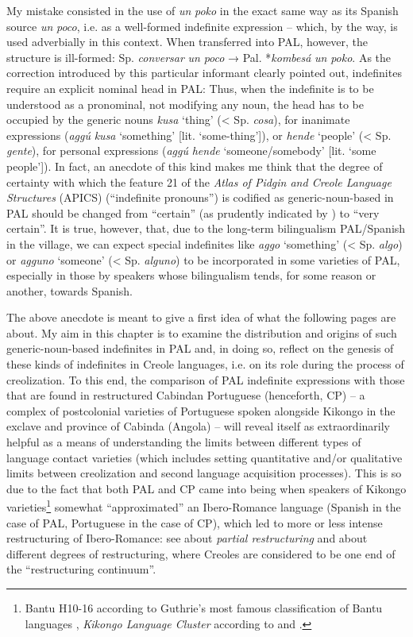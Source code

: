 \documentclass[output=paper,colorlinks,citecolor=brown]{langscibook}
\begin{document}
My mistake consisted in the use of \textit{un} \textit{poko} in the exact same way as its Spanish source \textit{un} \textit{poco}, i.e. as a well-formed indefinite expression -- which, by the way, is used adverbially in this context. When transferred into PAL, however, the structure is ill-formed: Sp. \textit{conversar} \textit{un} \textit{poco} → Pal. *\textit{kombesá} \textit{un} \textit{poko}. As the correction introduced by this particular informant clearly pointed out, indefinites require an explicit nominal head in PAL: Thus, when the indefinite is to be understood as a pronominal, not modifying any noun, the head has to be occupied by the generic nouns \textit{kusa} ‘thing’ (< Sp. \textit{cosa}), for inanimate expressions (\textit{aggú} \textit{kusa} ‘something’ [lit. ‘some-thing’]), or \textit{hende} ‘people’ (< Sp. \textit{gente}), for personal expressions (\textit{aggú} \textit{hende} ‘someone\slash somebody’ [lit. ‘some people’]). In fact, an anecdote of this kind makes me think that the degree of certainty with which the feature 21 of the \textit{Atlas of Pidgin and Creole Language Structures} (APICS) (“indefinite pronouns”) is codified as generic-noun-based in PAL should be changed from “certain” (as prudently indicated by \cite{Schwegler2013}) to “very certain”. It is true, however, that, due to the long-term bilingualism PAL/Spanish in the village, we can expect special indefinites like \textit{aggo} ‘something’ (< Sp. \textit{algo}) or \textit{agguno} ‘someone’ (< Sp. \textit{alguno}) to be incorporated in some varieties of PAL, especially in those by speakers whose bilingualism tends, for some reason or another, towards Spanish.

The above anecdote is meant to give a first idea of what the following pages are about. My aim in this chapter is to examine the distribution and origins of such generic-noun-based indefinites in PAL and, in doing so, reflect on the genesis of these kinds of indefinites in Creole languages, i.e. on its role during the process of creolization. To this end, the comparison of PAL indefinite expressions with those that are found in restructured Cabindan Portuguese (henceforth, CP) -- a complex of postcolonial varieties of Portuguese spoken alongside Kikongo in the exclave and province of Cabinda (Angola) -- will reveal itself as extraordinarily helpful as a means of understanding the limits between different types of language contact varieties (which includes setting quantitative and/or qualitative limits between creolization and second language acquisition processes). This is so due to the fact that both PAL and CP came into being when speakers of Kikongo varieties\footnote{Bantu H10-16 according to Guthrie’s most famous classification of Bantu languages \citep{Guthrie1967}, \textit{Kikongo Language Cluster} according to \citet{Bostoen2012} and \citet{BostoenDeSchryver2015}.}  somewhat “approximated” an Ibero\hyp Romance language (Spanish in the case of PAL, Portuguese in the case of CP), which led to more or less intense restructuring of Ibero\hyp Romance: see \citet{Holm2004} about \textit{partial restructuring} and \citet{HolmLorenzinoDeMello1999} about different degrees of restructuring, where Creoles are considered to be one end of the “restructuring continuum”. 
\end{document}
